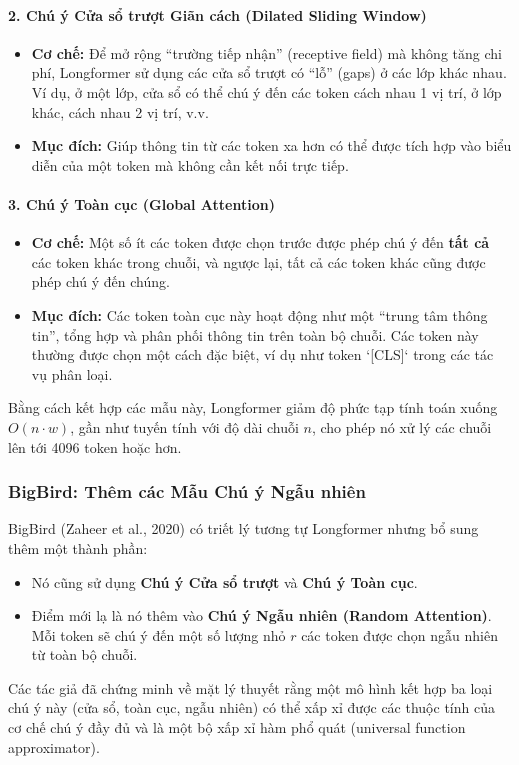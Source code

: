 \paragraph{2. Chú ý Cửa sổ trượt Giãn cách (Dilated Sliding Window)}
\begin{itemize}
    \item \textbf{Cơ chế:} Để mở rộng “trường tiếp nhận” (receptive field) mà không tăng chi phí, Longformer sử dụng các cửa sổ trượt có “lỗ” (gaps) ở các lớp khác nhau. Ví dụ, ở một lớp, cửa sổ có thể chú ý đến các token cách nhau 1 vị trí, ở lớp khác, cách nhau 2 vị trí, v.v.
    \item \textbf{Mục đích:} Giúp thông tin từ các token xa hơn có thể được tích hợp vào biểu diễn của một token mà không cần kết nối trực tiếp.
\end{itemize}

\paragraph{3. Chú ý Toàn cục (Global Attention)}
\begin{itemize}
    \item \textbf{Cơ chế:} Một số ít các token được chọn trước được phép chú ý đến \textbf{tất cả} các token khác trong chuỗi, và ngược lại, tất cả các token khác cũng được phép chú ý đến chúng.
    \item \textbf{Mục đích:} Các token toàn cục này hoạt động như một “trung tâm thông tin”, tổng hợp và phân phối thông tin trên toàn bộ chuỗi. Các token này thường được chọn một cách đặc biệt, ví dụ như token `[CLS]` trong các tác vụ phân loại.
\end{itemize}

Bằng cách kết hợp các mẫu này, Longformer giảm độ phức tạp tính toán xuống $O(n \cdot w)$, gần như tuyến tính với độ dài chuỗi $n$, cho phép nó xử lý các chuỗi lên tới 4096 token hoặc hơn.

\subsubsection{BigBird: Thêm các Mẫu Chú ý Ngẫu nhiên}
BigBird (Zaheer et al., 2020) \cite{zaheer2020big} có triết lý tương tự Longformer nhưng bổ sung thêm một thành phần:
\begin{itemize}
    \item Nó cũng sử dụng \textbf{Chú ý Cửa sổ trượt} và \textbf{Chú ý Toàn cục}.
    \item Điểm mới lạ là nó thêm vào \textbf{Chú ý Ngẫu nhiên (Random Attention)}. Mỗi token sẽ chú ý đến một số lượng nhỏ $r$ các token được chọn ngẫu nhiên từ toàn bộ chuỗi.
\end{itemize}
Các tác giả đã chứng minh về mặt lý thuyết rằng một mô hình kết hợp ba loại chú ý này (cửa sổ, toàn cục, ngẫu nhiên) có thể xấp xỉ được các thuộc tính của cơ chế chú ý đầy đủ và là một bộ xấp xỉ hàm phổ quát (universal function approximator).

